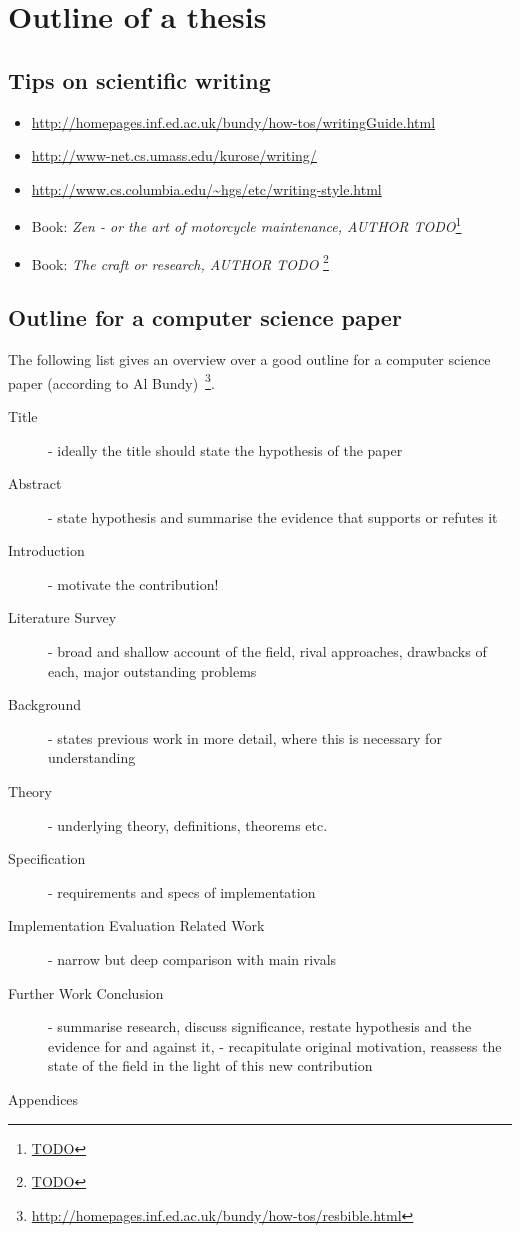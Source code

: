 \documentclass{article}
\begin{document}
\section{Outline of a thesis}



\subsection*{Tips on scientific writing}

\begin{itemize}
	\item \url{http://homepages.inf.ed.ac.uk/bundy/how-tos/writingGuide.html}
	\item \url{http://www-net.cs.umass.edu/kurose/writing/}
	\item \url{http://www.cs.columbia.edu/~hgs/etc/writing-style.html}
	\item Book: \emph{Zen - or the art of motorcycle maintenance, AUTHOR TODO}\footnote{\url{TODO}}
	\item Book: \emph{The craft or research, AUTHOR TODO} \footnote{\url{TODO}}
\end{itemize}




\subsection*{Outline for a computer science paper}

The following list gives an overview over a good outline for a computer science paper (according to Al Bundy)~\footnote{\url{http://homepages.inf.ed.ac.uk/bundy/how-tos/resbible.html}}.

\begin{description}
	\item[Title] - ideally the title should state the hypothesis of the paper
	\item[Abstract] - state hypothesis and summarise the evidence that supports or refutes it
	\item[Introduction] - motivate the contribution!
	\item[Literature Survey] - broad and shallow account of the field, rival approaches, drawbacks of each, major outstanding problems
	\item[Background] - states previous work in more detail, where this is necessary for understanding
	\item[Theory] - underlying theory, definitions, theorems etc.
	\item[Specification] - requirements and specs of implementation
	\item[Implementation Evaluation Related Work] - narrow but deep comparison with main rivals
	\item[Further Work Conclusion] - summarise research, discuss significance, restate hypothesis and the evidence for and against it, - recapitulate original motivation, reassess the state of the field in the light of this new contribution
	\item[Appendices]
\end{description}
\end{document}
